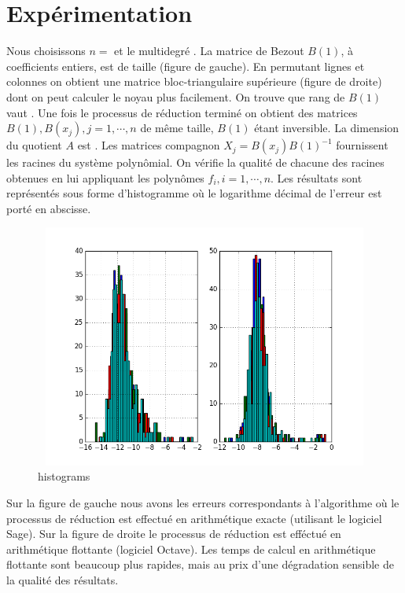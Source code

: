 \documentclass{standalone}
\begin{document}
  \section{Expérimentation}
  Nous choisissons $n=

$ et le multidegré $

$.
La matrice de Bezout $B(1)$, à coefficients entiers, est de taille  (figure de gauche). En permutant lignes et colonnes on obtient une matrice bloc-triangulaire supérieure (figure de droite) dont on peut calculer le noyau plus facilement.
On trouve que rang de $B(1)$ vaut . Une fois le processus de réduction terminé on obtient des matrices $B(1), B(x_j), j=1,\cdots,n$ de même taille, $B(1)$ étant inversible. La dimension du quotient $A$ est . Les matrices compagnon $X_j = B(x_j)B(1)^{-1}$ fournissent les racines du système polynômial. On vérifie la qualité de chacune des racines obtenues en lui appliquant les polynômes $f_i, i=1,\cdots,n$. Les résultats sont représentés sous forme d'histogramme o\`u le logarithme décimal de l'erreur est porté en abscisse.
\begin{figure}[!ht]
  \includegraphics[height=8cm, width=1.2\textwidth]{../png/ref.png}
  \caption{histograms}
\end{figure}


Sur la figure de gauche nous avons les erreurs correspondants à l'algorithme o\`u le processus de réduction est effectué en arithmétique exacte (utilisant le logiciel Sage). Sur la figure de droite le processus de réduction est efféctué en arithmétique flottante (logiciel Octave).
Les temps de calcul en arithmétique flottante sont beaucoup plus rapides, mais au prix d'une dégradation sensible de la qualité des résultats.
\end{document}
